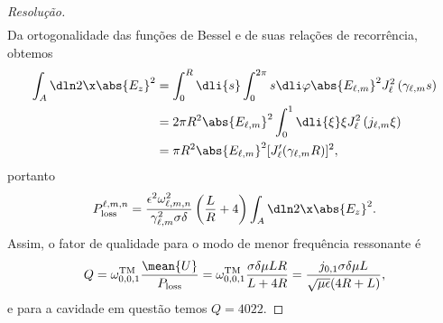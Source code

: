 \begin{proof}[Resolução]
\begin{align*}
    \end{align*}
    Da ortogonalidade das funções de Bessel e de suas relações de recorrência, obtemos
    \begin{align*}
        \int_A \dln2\x\abs{E_z}^2 &= \int_0^R \dli{s} \int_0^{2\pi} s\dli\varphi \abs{E_{\ell,m}}^2J_\ell^2\left(\gamma_{\ell,m} s\right)\\
                                  &= 2\pi R^2 \abs{E_{\ell,m}}^2 \int_0^1 \dli{\xi} \xi J_\ell^2\left(j_{\ell,m} \xi\right)\\
                                  &= \pi R^2 \abs{E_{\ell,m}}^2  [J_\ell'(\gamma_{\ell,m} R)]^2,
    \end{align*}
    portanto
    \begin{equation*}
        P^{\ell,m,n}_\mathrm{loss} = \frac{\epsilon^2 \omega^2_{\ell,m,n}}{\gamma^2_{\ell,m} \sigma \delta} \left(\frac{L}{R} + 4\right)\int_A \dln2\x \abs{E_z}^2.
    \end{equation*}
    Assim, o fator de qualidade para o modo de menor frequência ressonante é
    \begin{equation*}
        Q = \omega^\mathrm{TM}_{0,0,1}\frac{\mean{U}}{P_\mathrm{loss}} = \omega^\mathrm{TM}_{0,0,1} \frac{\sigma \delta \mu LR}{L + 4R}= \frac{j_{0,1}\sigma \delta \mu L}{\sqrt{\mu\epsilon} (4R + L)},
    \end{equation*}
    e para a cavidade em questão temos \(Q = 4022.\)
\end{proof}
